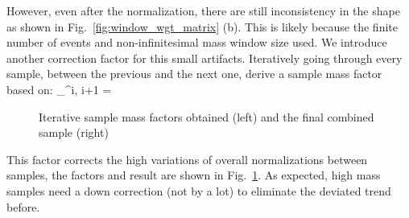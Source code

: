 However, even after the normalization, there are still inconsistency in the shape as shown
in Fig.~\ref{fig:window_wgt_matrix} (b). This is likely because the finite number of events
and non-infinitesimal mass window size used. We introduce another correction factor for
this small artifacts. Iteratively going through every sample, between the previous and the
next one, derive a sample mass factor based on:
\be
{}_^{i, i+1} = 
\ee

\begin{figure}[htb]
    \begin{center}
    \end{center}
    \caption{Iterative sample mass factors obtained (left) and the final combined sample (right)}
    \label{fig:LHE_rewgt}
\end{figure}

This factor corrects the high variations of overall normalizations between samples, the factors and result
are shown in Fig.~\ref{fig:LHE_rewgt}. As expected, high mass samples need a down correction (not by a lot)
to eliminate the deviated trend before.


